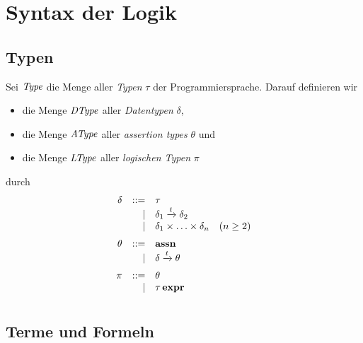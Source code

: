 \documentclass[12pt,a4paper,bigheadings]{scrartcl}
\newcommand{\assn}{\ensuremath{\mathbf{assn}}}
\newcommand{\bexpr}{\ensuremath{\mathbf{expr}}}
\newcommand{\etype}[1]{#1\,\bexpr}
\newcommand{\Dtype}{\name{DType}}
\newcommand{\Atype}{\name{AType}}
\newcommand{\tto}{\ensuremath{\xrightarrow{t}}}
\begin{document}
\section{Syntax der Logik}

\subsection{Typen}

Sei ${\text{\it Type\/}}$ die Menge aller {\em Typen} $\tau$ der Programmiersprache. Darauf definieren wir 
\begin{itemize}
  \item die Menge $\Dtype$ aller {\em Datentypen} $\delta$,
  \item die Menge $\Atype$ aller {\em assertion types} $\theta$ und
  \item die Menge ${\text{\it LType\/}}$ aller {\em logischen Typen} $\pi$
\end{itemize}
durch
\[\bgram
\delta  \is \tau
        \al \delta_1 \tto \delta_2
        \al \delta_1 \times \ldots \times \delta_n \quad (n \ge 2)
        \n
\theta  \is \assn
        \al \delta \tto \theta
        \n
\pi \is \theta
    \al \etype{\tau}
    \n
\egram\]

\subsection{Terme und Formeln}
\end{document}
